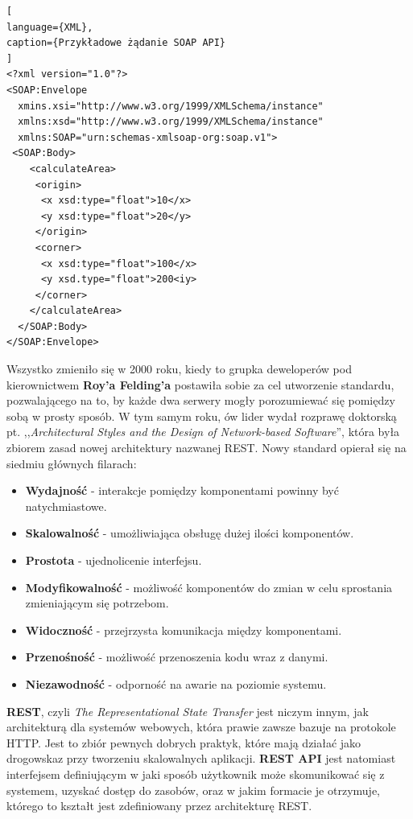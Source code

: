 \documentclass[oneside,polski,logo,indent]{amuthesis}
\begin{document}
\begin{lstlisting}[
language={XML},
caption={Przykładowe żądanie SOAP API}
]
<?xml version="1.0"?>
<SOAP:Envelope 
  xmins.xsi="http://www.w3.org/1999/XMLSchema/instance" 
  xmlns:xsd="http://www.w3.org/1999/XMLSchema/instance" 
  xmlns:SOAP="urn:schemas-xmlsoap-org:soap.v1">
 <SOAP:Body>
    <calculateArea>
     <origin>
      <x xsd:type="float">10</x>
      <y xsd:type="float">20</y>
     </origin>
     <corner>
      <x xsd:type="float">100</x>
      <y xsd.type="float">200<iy>
     </corner>
    </calculateArea>
  </SOAP:Body>
</SOAP:Envelope>
\end{lstlisting}


Wszystko zmieniło się w 2000 roku, kiedy to grupka deweloperów pod kierownictwem \textbf{Roy’a Felding’a} postawiła sobie za cel utworzenie standardu, pozwalającego na to, by każde dwa serwery mogły porozumiewać się pomiędzy sobą w prosty sposób. W tym samym roku, ów lider wydał rozprawę doktorską pt. ,,\emph{Architectural Styles and the Design of Network-based Software}'', która była zbiorem zasad nowej architektury nazwanej REST. Nowy standard opierał się na siedmiu głównych filarach:\newline 
\begin{itemize}
\item \textbf{Wydajność} - interakcje pomiędzy komponentami powinny być natychmiastowe.\newline
\item \textbf{Skalowalność} - umożliwiająca obsługę dużej ilości komponentów.\newline
\item \textbf{Prostota} - ujednolicenie interfejsu.\newline
\item \textbf{Modyfikowalność} - możliwość komponentów do zmian w celu sprostania zmieniającym się potrzebom.\newline
\item \textbf{Widoczność} - przejrzysta komunikacja między komponentami.\newline
\item \textbf{Przenośność} - możliwość przenoszenia kodu wraz z danymi.\newline
\item \textbf{Niezawodność} - odporność na awarie na poziomie systemu.\newline
\end{itemize}
\textbf{REST}, czyli \emph{The Representational State Transfer} jest niczym innym, jak architekturą dla systemów webowych, która prawie zawsze bazuje na protokole HTTP. Jest to zbiór pewnych dobrych praktyk, które mają działać jako drogowskaz przy tworzeniu skalowalnych aplikacji. \textbf{REST API} jest natomiast interfejsem definiującym w jaki sposób użytkownik może skomunikować się z systemem, uzyskać dostęp do zasobów, oraz w jakim formacie je otrzymuje, którego to kształt jest zdefiniowany przez architekturę REST. 
\end{document}
